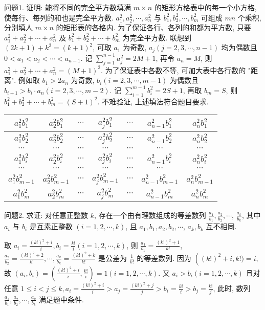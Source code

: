 
问题1. 证明: 能将不同的完全平方数填满 $m \times n$ 的矩形方格表中的每一个小方格, 使每行、每列的和也是完全平方数.
$a_1^2, a_2^2, \cdots, a_n^2$ 与 $b_1^2, b_2^2, \cdots, b_m^2$ 可组成 $m n$ 个乘积, 分别填人 $m \times n$ 的矩形表的各格内.
为了保证各行、各列的和都为平方数, 只要 $a_1^2+a_2^2+ \cdots+a_n^2$ 及 $b_1^2+b_2^2+\cdots+b_m^2$ 为完全平方数.
联想到 $(2 k+1)+k^2=(k+1)^2$, 可取 $a_1$ 为奇数, $a_j(j=2,3, \cdots, n-1)$ 均为偶数且 $0<a_1<a_2<\cdots<a_{n-1}$. 记 $\sum_{j=1}^{n-1} a_j^2=2 M+1$, 再令 $a_n=M$, 则 $a_1^2+a_2^2+\cdots+a_n^2=(M+1)^2$. 为了保证表中各数不等, 可加大表中各行数的 "距离". 例如取 $b_1>2 a_n$ 为奇数,
$b_i(i=2,3, \cdots, m-1)$ 为偶数且 $b_{i+1}>b_i \cdot a_n(i=2,3, \cdots, m-2)$. 记 $\sum_{i=1}^{m-1} b_i^2=2 S+1$, 再取 $b_m=S$, 则 $b_1^2+b_2^2+\cdots+b_m^2=(S+1)^2$. 不难验证, 上述填法符合题目要求.
\begin{tabular}{|c|c|c|c|c|c|c|}
\hline$a_1^2 b_1^2$ & $a_2^2 b_1^2$ & $\cdots$ & $a_j^2 b_1^2$ & $\cdots$ & $a_{n-1}^2 b_1^2$ & $a_n^2 b_1^2$ \\
\hline$a_1^2 b_2^2$ & $a_2^2 b_2^2$ & $\cdots$ & $a_j^2 b_2^2$ & $\cdots$ & $a_{n-1}^2 b_2^2$ & $a_n^2 b_2^2$ \\
\hline$\cdots$ & $\cdots$ & $\cdots$ & $\cdots$ & $\cdots$ & $\cdots$ & $\cdots$ \\
\hline$a_1^2 b_i^2$ & $a_2^2 b_i^2$ & $\cdots$ & $a_j^2 b_i^2$ & $\cdots$ & $a_{n-1}^2 b_i^2$ & $a_n^2 b_i^2$ \\
\hline$\cdots$ & $\cdots$ & $\cdots$ & $\cdots$ & $\cdots$ & $\cdots$ & $\cdots$ \\
\hline$a_1^2 b_{m-1}^2$ & $a_2^2 b_{m-1}^2$ & $\cdots$ & $a_j^2 b_{m-1}^2$ & $\cdots$ & $a_{n-1}^2 b_{m-1}^2$ & $a_n^2 b_{m-1}^2$ \\
\hline$a_1^2 b_m^2$ & $a_2^2 b_m^2$ & $\cdots$ & $a_j^2 b_m^2$ & $\cdots$ & $a_{n-1}^2 b_m^2$ & $a_n^2 b_m^2$ \\
\hline
\end{tabular}



问题2. 求证: 对任意正整数 $k$, 存在一个由有理数组成的等差数列 $\frac{a_1}{b_1}, \frac{a_2}{b_2}, \cdots$, $\frac{a_k}{b_k}$, 其中 $a_i$ 与 $b_i$ 是互素正整数 $(i=1,2, \cdots, k)$, 且 $a_1, b_1, a_2, b_2, \cdots$, $a_k, b_k$ 互不相同.
 
取 $a_i=\frac{(k !)^2+i}{i}, b_i=\frac{k !}{i}(i=1,2, \cdots, k)$, 则 $\frac{a_1}{b_1}=\frac{(k !)^2+1}{k !}$, $\frac{a_2}{b_2}=\frac{(k !)^2+2}{k !}, \cdots, \frac{a_k}{b_k}=\frac{(k !)^2+k}{k !}$ 是公差为 $\frac{1}{k !}$ 的等差数列.
因为 $\left((k !)^2+\right. i, k !)=i$, 故 $\left(a_i, b_i\right)=\left(\frac{(k !)^2+i}{i}, \frac{k !}{i}\right)=1(i=1,2, \cdots, k)$. 又 $a_i> b_i(i=1,2, \cdots, k)$ 且对任意 $1 \leqslant i<j \leqslant k, a_i=\frac{(k !)^2+i}{i}>a_j=\frac{(k !)^2+j}{j} >b_i=\frac{k !}{i}>b_j=\frac{k !}{j}$, 此时, 数列 $\frac{a_1}{b_1}, \frac{a_2}{b_2}, \cdots, \frac{a_k}{b_k}$ 满足题中条件.



